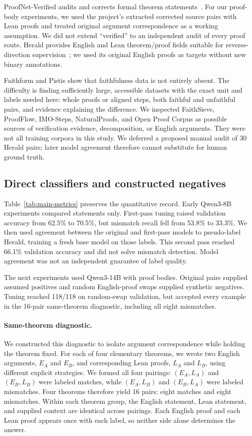 \documentclass[sigconf,nonacm]{acmart}
\begin{document}
ProofNet-Verified audits and corrects formal theorem statements~\cite{proofnet}. For our proof-body experiments, we used the project's extracted corrected source pairs with Lean proofs and treated original argument correspondence as a working assumption. We did not extend ``verified'' to an independent audit of every proof route. Herald provides English and Lean theorem/proof fields suitable for reverse-direction supervision~\cite{herald}; we used its original English proofs as targets without new binary annotations.

Faithform and Pistis show that faithfulness data is not entirely absent. The difficulty is finding sufficiently large, accessible datasets with the exact unit and labels needed here: whole proofs or aligned steps, both faithful and unfaithful pairs, and evidence explaining the difference. We inspected FaithSieve, ProofFlow, IMO-Steps, NaturalProofs, and Open Proof Corpus as possible sources of verification evidence, decomposition, or English arguments. They were not all training corpora in this study. We deferred a proposed manual audit of 30 Herald pairs; later model agreement therefore cannot substitute for human ground truth.

\subsection{Direct classifiers and constructed negatives}
Table~\ref{tab:main-metrics} preserves the quantitative record. Early Qwen3-8B experiments compared statements only. First-pass tuning raised validation accuracy from 62.5\% to 70.5\%, but mismatch recall fell from 53.8\% to 33.3\%. We then used agreement between the original and first-pass models to pseudo-label Herald, training a fresh base model on those labels. This second pass reached 66.1\% validation accuracy and did not solve mismatch detection. Model agreement was not an independent guarantee of label quality.

The next experiments used Qwen3-14B with proof bodies. Original pairs supplied assumed positives and random English-proof swaps supplied synthetic negatives. Tuning reached 118/118 on random-swap validation, but accepted every example in the 16-pair same-theorem diagnostic, including all eight mismatches.

\paragraph{Same-theorem diagnostic.}
We constructed this diagnostic to isolate argument correspondence while holding the theorem fixed. For each of four elementary theorems, we wrote two English arguments, $E_A$ and $E_B$, and corresponding Lean proofs, $L_A$ and $L_B$, using different explicit strategies. We formed all four pairings: $(E_A,L_A)$ and $(E_B,L_B)$ were labeled matches, while $(E_A,L_B)$ and $(E_B,L_A)$ were labeled mismatches. Four theorems therefore yield 16 pairs: eight matches and eight mismatches. Within each theorem group, the English statement, Lean statement, and supplied context are identical across pairings. Each English proof and each Lean proof appears once with each label, so neither side alone determines the answer.
\end{document}
